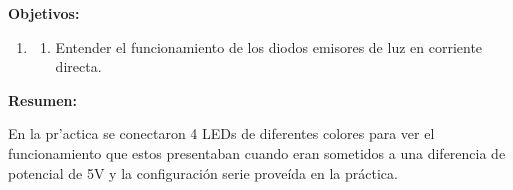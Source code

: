 \documentclass[11pt, letterpaper]{report}
\newenvironment{enumTab}{\begin{enumerate}[label=]\item \begin{enumerate}[label=$\bullet$]}{\end{enumerate}\end{enumerate}} %
\newenvironment{block}[1]{\hspace{-0.8 cm}\textbf{\Large #1}}{\vspace{3 mm}} %
\begin{document}
 
	
	
	\begin{block}{Objetivos:}
		\begin{enumTab}
			\item Entender el funcionamiento de los diodos emisores de luz en corriente directa.
		\end{enumTab}
	\end{block}

	\begin{block}{Resumen:}
		
		En la pr'actica se conectaron 4 LEDs de diferentes colores para ver el funcionamiento que estos presentaban cuando eran sometidos a una diferencia de potencial de 5V y la configuraci\'on serie prove\'ida en la pr\'actica.
	\end{block}
		
\end{document}
